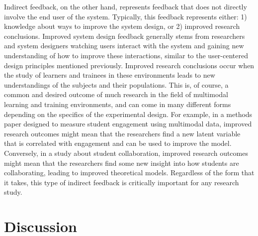 \documentclass[manuscript,screen,review]{acmart}
\begin{document}
Indirect feedback, on the other hand, represents feedback that does not directly involve the end user of the system. Typically, this feedback represents either: 1) knowledge about ways to improve the system design, or 2) improved research conclusions. Improved system design feedback generally stems from researchers and system designers watching users interact with the system and gaining new understanding of how to improve these interactions, similar to the user-centered design principles mentioned previously. Improved research conclusions occur when the study of learners and trainees in these environments leads to new understandings of the subjects and their populations. This is, of course, a common and desired outcome of much research in the field of multimodal learning and training environments, and can come in many different forms depending on the specifics of the experimental design. For example, in a methods paper designed to measure student engagement using multimodal data, improved research outcomes might mean that the researchers find a new latent variable that is correlated with engagement and can be used to improve the model. Conversely, in a study about student collaboration, improved research outcomes might mean that the researchers find some new insight into how students are collaborating, leading to improved theoretical models. Regardless of the form that it takes, this type of indirect feedback is critically important for any research study.

\section{Discussion} \label{sec:discussion}
\end{document}
